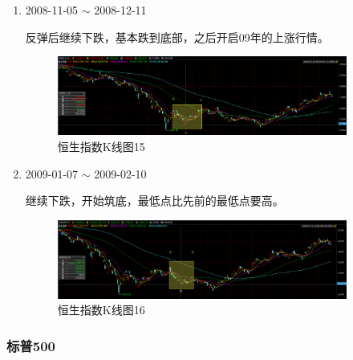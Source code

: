 \documentclass[12pt,a4paper]{article}
\begin{document}
\begin{enumerate}
	\item 2008-11-05 $\sim$ 2008-12-11
	
	反弹后继续下跌，基本跌到底部，之后开启09年的上涨行情。
	
	\begin{figure}[H]
		\centering
		\includegraphics[width=0.9\textwidth]{img/45.png}%
		\caption{恒生指数K线图15}
	\end{figure}
	
	\item 2009-01-07 $\sim$ 2009-02-10
	
	继续下跌，开始筑底，最低点比先前的最低点要高。
	
	\begin{figure}[H]
		\centering
		\includegraphics[width=0.9\textwidth]{img/46.png}%
		\caption{恒生指数K线图16}
	\end{figure}
	
	
\end{enumerate}


\subsubsection{标普500}
\end{document}
